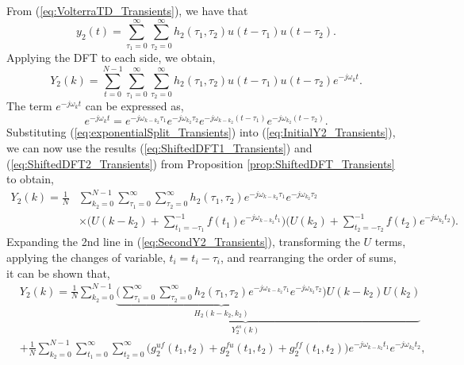 \begin{proof*}
From (\ref{eq:VolterraTD_Transients}), we have that
\begin{equation*}
y_2(t) = \sum_{\tau_1=0}^{\infty} \sum_{\tau_2=0}^{\infty} h_2(\tau_1,\tau_2) u(t-\tau_1) u(t-\tau_2).
\end{equation*}
Applying the DFT to each side, we obtain,
\begin{equation}
\label{eq:InitialY2_Transients}
Y_2(k) = \sum_{t=0}^{N-1} \sum_{\tau_1=0}^{\infty} \sum_{\tau_2=0}^{\infty} h_2(\tau_1,\tau_2) u(t-\tau_1) u(t-\tau_2) e^{-j \omega_k t}.
\end{equation}
The term $e^{-j \omega_k t}$ can be expressed as,
\begin{equation}
\label{eq:exponentialSplit_Transients}
e^{-j \omega_k t} =  e^{-j \omega_{k-k_2} \tau_1} e^{-j \omega_{k_2} \tau_2} e^{-j \omega_{k-k_2} (t-\tau_1)} e^{-j \omega_{k_2} (t-\tau_2)}.
\end{equation}
Substituting (\ref{eq:exponentialSplit_Transients}) into (\ref{eq:InitialY2_Transients}), we can now use the results (\ref{eq:ShiftedDFT1_Transients}) and (\ref{eq:ShiftedDFT2_Transients}) from Proposition \ref{prop:ShiftedDFT_Transients} to obtain,
\begin{equation}
\begin{aligned}
\label{eq:SecondY2_Transients}
Y_2(k) = \frac{1}{N} &\sum_{k_2=0}^{N-1} \sum_{\tau_1=0}^{\infty} \sum_{\tau_2=0}^{\infty} h_2(\tau_1,\tau_2) e^{-j \omega_{k-k_2} \tau_1} e^{-j \omega_{k_2} \tau_2} \\
&\times \Bigg( U(k-k_2) + \sum_{t_1=-\tau_1}^{-1} f(t_1) e^{-j \omega_{k-k_2} t_1}\Bigg) \Bigg( U(k_2) + \sum_{t_2=-\tau_2}^{-1} f(t_2) e^{-j \omega_{k_2} t_2}\Bigg).
\end{aligned}
\end{equation}
Expanding the 2nd line in (\ref{eq:SecondY2_Transients}), transforming the $U$ terms, applying the changes of variable, $t_i = t_i-\tau_i$, and rearranging the order of sums, it can be shown that,
\begin{equation}
\begin{aligned}
\label{eq:ThirdY2_Transients}
&Y_2(k) = \underbrace{\frac{1}{N} \sum_{k_2=0}^{N-1} \underbrace{\Bigg( \sum_{\tau_1=0}^{\infty} \sum_{\tau_2=0}^{\infty} h_2(\tau_1,\tau_2) e^{-j \omega_{k-k_2} \tau_1} e^{-j \omega_{k_2} \tau_2} \Bigg)}_{H_2(k-k_2,k_2)} U(k-k_2) U(k_2)}_{Y_2^{ss}(k)}\\
&+ \frac{1}{N} \sum_{k_2=0}^{N-1} \sum_{t_1=0}^{\infty} \sum_{t_2=0}^{\infty}\bigg( g_2^{uf}(t_1,t_2) + g_2^{fu}(t_1,t_2) + g_2^{ff}(t_1,t_2)\bigg) e^{-j \omega_{k-k_2} t_1} e^{-j \omega_{k_2} t_2},

\end{aligned}
\end{equation}
\end{proof*}

